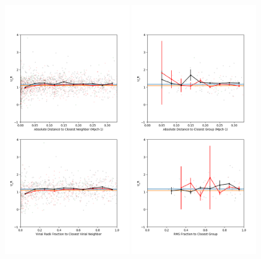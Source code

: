 \begin{figure}
    \includegraphics[width=0.49\textwidth]{Images/smallScaleEnvironment/dwarf_ur_300}
    \includegraphics[width=0.49\textwidth]{Images/smallScaleEnvironment/dwarf_ur_300_group}

\end{figure}
